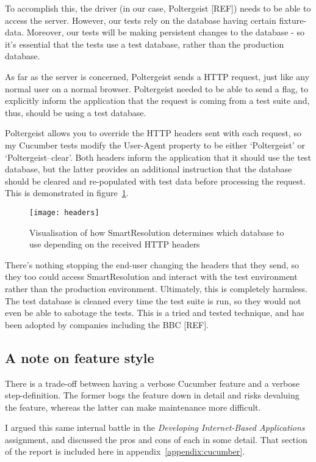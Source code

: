 To accomplish this, the driver (in our case, Poltergeist [REF]) needs to be able to access the server. However, our tests rely on the database having certain fixture-data. Moreover, our tests will be making persistent changes to the database - so it's essential that the tests use a test database, rather than the production database.

As far as the server is concerned, Poltergeist sends a HTTP request, just like any normal user on a normal browser. Poltergeist needed to be able to send a flag, to explicitly inform the application that the request is coming from a test suite and, thus, should be using a test database.

Poltergeist allows you to override the HTTP headers sent with each request, so my Cucumber tests modify the User-Agent property to be either `Poltergeist' or `Poltergeist--clear'. Both headers inform the application that it should use the test database, but the latter provides an additional instruction that the database should be cleared and re-populated with test data before processing the request. This is demonstrated in figure~\ref{uml:headers}.

\begin{figure}[h!]
  \centering
    \ifimages
    \texttt{[image: headers]}
    \fi
  \caption{Visualisation of how SmartResolution determines which database to use depending on the received HTTP headers}
  \label{uml:headers}
\end{figure}

There's nothing stopping the end-user changing the headers that they send, so they too could access SmartResolution and interact with the test environment rather than the production environment. Ultimately, this is completely harmless. The test database is cleaned every time the test suite is run, so they would not even be able to sabotage the tests. This is a tried and tested technique, and has been adopted by companies including the BBC [REF].

\subsection{A note on feature style}

There is a trade-off between having a verbose Cucumber feature and a verbose step-definition. The former bogs the feature down in detail and risks devaluing the feature, whereas the latter can make maintenance more difficult.

I argued this same internal battle in the \emph{Developing Internet-Based Applications} assignment, and discussed the pros and cons of each in some detail. That section of the report is included here in appendix~\ref{appendix:cucumber}.

